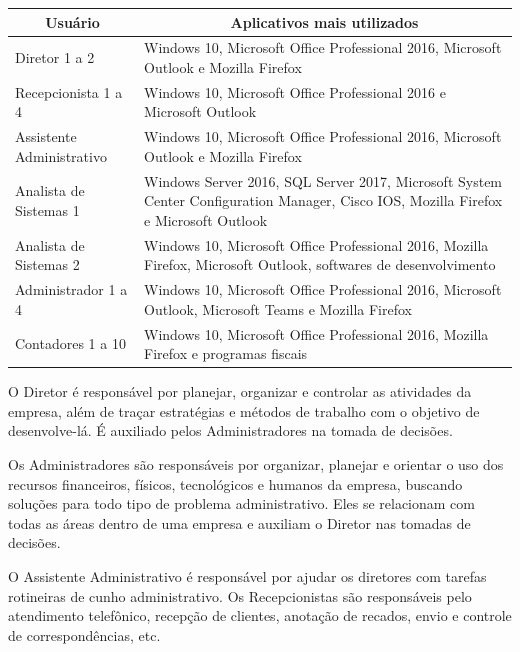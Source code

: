 \documentclass[	DIV=calc,%
							paper=a4,%
							fontsize=12pt,%
							onecolumn]{scrartcl}	 					%
\begin{document}
\begin{table}[t]
	\begin{tabular}{|l|l|}
		\hline
		\multicolumn{1}{|c|}{\textbf{Usuário}} & \multicolumn{1}{c|}{\textbf{Aplicativos mais utilizados}}                                                                           \\ \hline
		Diretor 1 a 2 & Windows 10, Microsoft Office Professional 2016, Microsoft Outlook e Mozilla Firefox 
		\\ \hline
		Recepcionista 1 a 4 & Windows 10, Microsoft Office Professional 2016 e Microsoft Outlook                                                               \\ \hline
		Assistente Administrativo & Windows 10, Microsoft Office Professional 2016, Microsoft Outlook e Mozilla Firefox 
		\\ \hline
		Analista de Sistemas 1 & Windows Server 2016, SQL Server 2017, Microsoft System Center Configuration Manager, Cisco IOS, Mozilla Firefox e Microsoft Outlook 
		\\ \hline
		Analista de Sistemas 2 & Windows 10, Microsoft Office Professional 2016, Mozilla Firefox, Microsoft Outlook, softwares de desenvolvimento                    
		\\ \hline
		Administrador 1 a 4 & Windows 10, Microsoft Office Professional 2016, Microsoft Outlook, Microsoft Teams e Mozilla Firefox 
		\\ \hline
		Contadores 1 a 10 & Windows 10, Microsoft Office Professional 2016, Mozilla Firefox e programas fiscais 
		\\ \hline
	\end{tabular}
	\label{tab:usuarios}
\end{table}

O Diretor é responsável por planejar, organizar e controlar as atividades da empresa, além de traçar estratégias e métodos de trabalho com o objetivo de desenvolve-lá. É auxiliado pelos Administradores na tomada de decisões. 

Os Administradores são responsáveis por organizar, planejar e orientar o uso dos recursos financeiros, físicos, tecnológicos e humanos da empresa, buscando soluções para todo tipo de problema administrativo. Eles se relacionam com todas as áreas dentro de uma empresa e auxiliam o Diretor nas tomadas de decisões.

O Assistente Administrativo é responsável por ajudar os diretores com tarefas rotineiras de cunho administrativo.
Os Recepcionistas são responsáveis pelo atendimento telefônico, recepção de clientes, anotação de recados, envio e controle de correspondências, etc.
\end{document}

